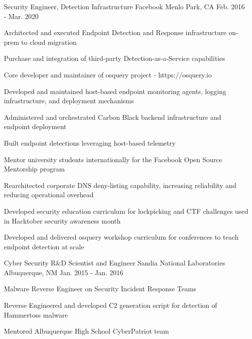 \begin{cventries}
\cventry
{Security Engineer, Detection Infrastructure} %
{Facebook} %
{Menlo Park, CA} %
{Feb. 2016 - Mar. 2020} %
{ %
\begin{cvitems}
\item {Architected and executed Endpoint Detection and Response infrastructure on-prem to cloud migration}
\item {Purchase and integration of third-party Detection-as-a-Service capabilities}
\item {Core developer and maintainer of osquery project - https://osquery.io}
\item {Developed and maintained host-based endpoint monitoring agents, logging infrastructure, and deployment mechanisms}
\item {Administered and orchestrated Carbon Black backend infrastructure and endpoint deployment}
\item {Built endpoint detections leveraging host-based telemetry}
\item {Mentor university students internationally for the Facebook Open Source Mentorship program}
\item {Rearchitected corporate DNS deny-listing capability, increasing reliability and reducing operational overhead}
\item {Developed security education curriculum for lockpicking and CTF challenges used in Hacktober security awareness month}
\item {Developed and delivered osquery workshop curriculum for conferences to teach endpoint detection at scale}
\end{cvitems}
}


\cventry
{Cyber Security R\&D Scientist and Engineer} %
{Sandia National Laboratories} %
{Albuquerque, NM} %
{Jan. 2015 - Jan. 2016} %
{ %
\begin{cvitems}
\item {Malware Reverse Engineer on Security Incident Response Teams}
\item {Reverse Engineered and developed C2 generation script for detection of Hammertoss malware}
\item {Mentored Albuquerque High School CyberPatriot team}
\end{cvitems}
}



\end{cventries}
